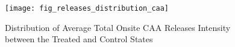 \begin{figure}[H]
    \centering
    \texttt{[image: fig\_releases\_distribution\_caa]}
    \caption{Distribution of Average Total Onsite CAA Releases Intensity between the Treated and Control States}
    \label{fig:releases-distribution-caa}
\end{figure}